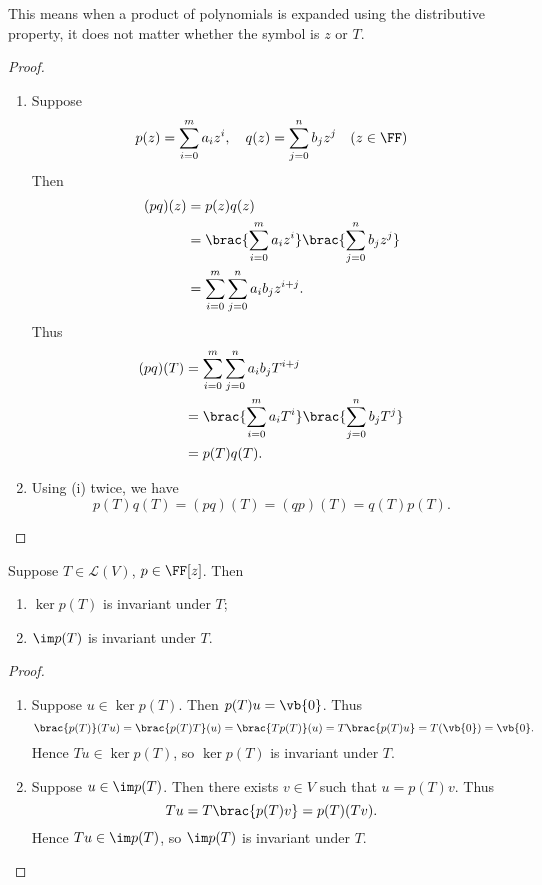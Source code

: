 \begin{remark}
This means when a product of polynomials is expanded using the distributive property, it does not matter whether the symbol is $z$ or $T$.
\end{remark}

\begin{proof} \
\begin{enumerate}[label=(\roman*)]
\item Suppose
\[p(z)=\sum_{i=0}^{m}a_iz^i,\quad q(z)=\sum_{j=0}^{n}b_jz^j\quad(z\in\FF)\]
Then
\begin{align*}
(pq)(z)&=p(z)q(z)\\
&=\brac{\sum_{i=0}^{m}a_iz^i}\brac{\sum_{j=0}^{n}b_jz^j}\\
&=\sum_{i=0}^{m}\sum_{j=0}^{n}a_ib_jz^{i+j}.
\end{align*}
Thus
\begin{align*}
(pq)(T)&=\sum_{i=0}^{m}\sum_{j=0}^{n}a_ib_jT^{i+j}\\
&=\brac{\sum_{i=0}^{m}a_iT^i}\brac{\sum_{j=0}^{n}b_jT^j}\\
&=p(T)q(T).
\end{align*}

\item Using (i) twice, we have
\[p(T)q(T)=(pq)(T)=(qp)(T)=q(T)p(T).\]
\end{enumerate}
\end{proof}

\begin{proposition}
Suppose $T\in\mathcal{L}(V)$, $p\in\FF[z]$. Then
\begin{enumerate}[label=(\roman*)]
\item $\ker p(T)$ is invariant under $T$;
\item $\im p(T)$ is invariant under $T$.
\end{enumerate}
\end{proposition}

\begin{proof} \

\begin{enumerate}[label=(\roman*)]
\item Suppose $u\in\ker p(T)$. Then $p(T)u=\vb{0}$. Thus
\[\brac{p(T)}(Tu)=\brac{p(T)T}(u)=\brac{Tp(T)}(u)=T\brac{p(T)u}=T(\vb{0})=\vb{0}.\]
Hence $Tu\in\ker p(T)$, so $\ker p(T)$ is invariant under $T$.

\item Suppose $u\in\im p(T)$. Then there exists $v\in V$ such that $u=p(T)v$. Thus
\[Tu=T\brac{p(T)v}=p(T)(Tv).\]
Hence $Tu\in\im p(T)$, so $\im p(T)$ is invariant under $T$.
\end{enumerate}
\end{proof}
\pagebreak

